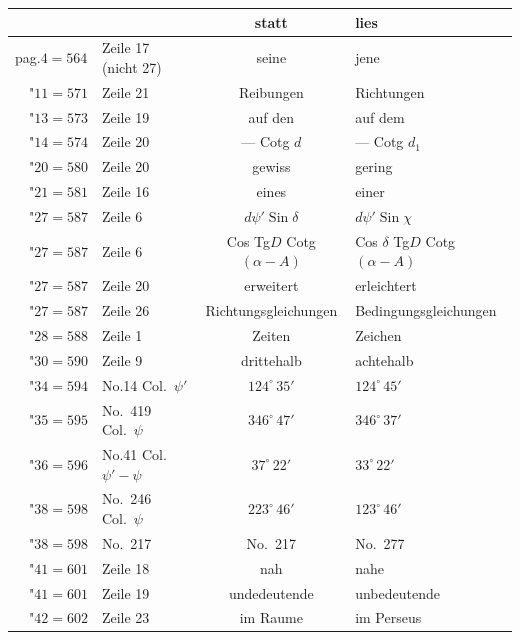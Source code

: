 \documentclass[12pt,a4paper]{article}
\theoremstyle{plain}
\theoremstyle{definition}
\theoremstyle{remark}
\begin{document}
\begin{center}
\begin{tabular}{|l|l|c|l|}
\hline
\multicolumn{2}{|c|}{} & statt & lies \\
\hline
pag.\quad $4 = 564$ & Zeile 17 (nicht 27) & seine & jene \\
\quad\ \ "$11 = 571$ & Zeile 21 & Reibungen & Richtungen \\
\quad\ \ "$13 = 573$ & Zeile 19 & auf den & auf dem \\
\quad\ \ "$14 = 574$ & Zeile 20 & --- Cotg $d$ & --- Cotg $d_1$ \\
\quad\ \ "$20 = 580$ & Zeile 20 & gewiss & gering \\
\quad\ \ "$21 = 581$ & Zeile 16 & eines & einer \\
\quad\ \ "$27 = 587$ & Zeile \phantom{0}6 & $d\psi' \operatorname{Sin} \delta$ & $d\psi' \operatorname{Sin} \chi$ \\
\quad\ \ "$27 = 587$ & Zeile \phantom{0}6 & Cos Tg$D$ Cotg $(\alpha - A)$ & Cos $\delta$ Tg$D$ Cotg $(\alpha - A)$ \\
\quad\ \ "$27 = 587$ & Zeile 20 & erweitert & erleichtert \\
\quad\ \ "$27 = 587$ & Zeile 26 & Richtungsgleichungen & Bedingungsgleichungen \\
\quad\ \ "$28 = 588$ & Zeile \phantom{0}1 & Zeiten & Zeichen \\
\quad\ \ "$30 = 590$ & Zeile \phantom{0}9 & drittehalb & achtehalb \\
\quad\ \ "$34 = 594$ & No.\phantom{0}14 \quad Col.~$\psi'$ & $124^\circ\,35'$ & $124^\circ\,45'$ \\
\quad\ \ "$35 = 595$ & No.~419 \quad Col.~$\psi$ & $346^\circ\,47'$ & $346^\circ\,37'$ \\
\quad\ \ "$36 = 596$ & No.\phantom{0}41 \quad Col.~$\psi' - \psi$ & \phantom{0}$37^\circ\,22'$ & \phantom{0}$33^\circ\,22'$ \\
\quad\ \ "$38 = 598$ & No.~246 \quad Col.~$\psi$ & $223^\circ\,46'$ & $123^\circ\,46'$ \\
\quad\ \ "$38 = 598$ & No.~217 & No.~217 & No.~277 \\
\quad\ \ "$41 = 601$ & Zeile 18 & nah & nahe \\
\quad\ \ "$41 = 601$ & Zeile 19 & undedeutende & unbedeutende \\
\quad\ \ "$42 = 602$ & Zeile 23 & im Raume & im Perseus \\
\hline
\end{tabular}
\end{center}
\end{document}
